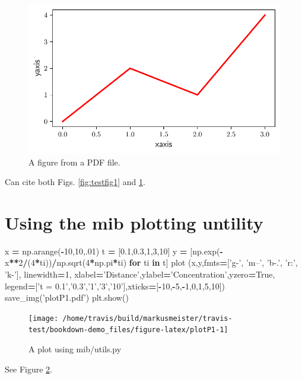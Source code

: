 \documentclass[]{book}
\newenvironment{Shaded}{\begin{snugshade}}{\end{snugshade}}
\newcommand{\ControlFlowTok}[1]{\textcolor[rgb]{0.13,0.29,0.53}{\textbf{#1}}}
\newcommand{\DecValTok}[1]{\textcolor[rgb]{0.00,0.00,0.81}{#1}}
\newcommand{\FloatTok}[1]{\textcolor[rgb]{0.00,0.00,0.81}{#1}}
\newcommand{\KeywordTok}[1]{\textcolor[rgb]{0.13,0.29,0.53}{\textbf{#1}}}
\newcommand{\NormalTok}[1]{#1}
\newcommand{\OperatorTok}[1]{\textcolor[rgb]{0.81,0.36,0.00}{\textbf{#1}}}
\newcommand{\StringTok}[1]{\textcolor[rgb]{0.31,0.60,0.02}{#1}}
\newcommand{\VariableTok}[1]{\textcolor[rgb]{0.00,0.00,0.00}{#1}}
\begin{document}
\begin{figure}

{\centering \includegraphics[width=0.33\linewidth]{img/testfig1} 

}

\caption{A figure from a PDF file.}\label{fig:testfig2}
\end{figure}

Can cite both Figs. \ref{fig:testfig1} and \ref{fig:testfig2}.

\hypertarget{using-the-mib-plotting-untility}{%
\section{Using the mib plotting untility}\label{using-the-mib-plotting-untility}}

\begin{Shaded}
\begin{Highlighting}[]
\NormalTok{x }\OperatorTok{=}\NormalTok{ np.arange(}\OperatorTok{-}\DecValTok{10}\NormalTok{,}\DecValTok{10}\NormalTok{,.}\DecValTok{01}\NormalTok{)}
\NormalTok{t }\OperatorTok{=}\NormalTok{ [}\FloatTok{0.1}\NormalTok{,}\FloatTok{0.3}\NormalTok{,}\DecValTok{1}\NormalTok{,}\DecValTok{3}\NormalTok{,}\DecValTok{10}\NormalTok{]}
\NormalTok{y }\OperatorTok{=}\NormalTok{ [np.exp(}\OperatorTok{-}\NormalTok{x}\OperatorTok{**}\DecValTok{2}\OperatorTok{/}\NormalTok{(}\DecValTok{4}\OperatorTok{*}\NormalTok{ti))}\OperatorTok{/}\NormalTok{np.sqrt(}\DecValTok{4}\OperatorTok{*}\NormalTok{np.pi}\OperatorTok{*}\NormalTok{ti) }\ControlFlowTok{for}\NormalTok{ ti }\KeywordTok{in}\NormalTok{ t]}
\NormalTok{plot (x,y,fmts}\OperatorTok{=}\NormalTok{[}\StringTok{'g-'}\NormalTok{, }\StringTok{'m--'}\NormalTok{, }\StringTok{'b-.'}\NormalTok{, }\StringTok{'r:'}\NormalTok{, }\StringTok{'k-'}\NormalTok{], linewidth}\OperatorTok{=}\DecValTok{1}\NormalTok{,}
\NormalTok{    xlabel}\OperatorTok{=}\StringTok{'Distance'}\NormalTok{,ylabel}\OperatorTok{=}\StringTok{'Concentration'}\NormalTok{,yzero}\OperatorTok{=}\VariableTok{True}\NormalTok{,}
\NormalTok{    legend}\OperatorTok{=}\NormalTok{[}\StringTok{'t = 0.1'}\NormalTok{,}\StringTok{'0.3'}\NormalTok{,}\StringTok{'1'}\NormalTok{,}\StringTok{'3'}\NormalTok{,}\StringTok{'10'}\NormalTok{],xticks}\OperatorTok{=}\NormalTok{[}\OperatorTok{-}\DecValTok{10}\NormalTok{,}\OperatorTok{-}\DecValTok{5}\NormalTok{,}\OperatorTok{-}\DecValTok{1}\NormalTok{,}\DecValTok{0}\NormalTok{,}\DecValTok{1}\NormalTok{,}\DecValTok{5}\NormalTok{,}\DecValTok{10}\NormalTok{])}
\NormalTok{save_img(}\StringTok{'plotP1.pdf'}\NormalTok{)}
\NormalTok{plt.show()}
\end{Highlighting}
\end{Shaded}

\begin{figure}

{\centering \texttt{[image: /home/travis/build/markusmeister/travis-test/bookdown-demo\_files/figure-latex/plotP1-1]} 

}

\caption{A plot using mib/utils.py}\label{fig:plotP1}
\end{figure}

See Figure \ref{fig:plotP1}.


\end{document}
